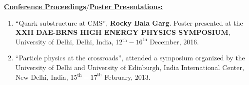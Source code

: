 \vspace{0.3cm}
\clearpage
{\large \underline{\textbf{Conference Proceedings$/$Poster Presentations:}}}
\begin{enumerate}
\item ``Quark substructure at CMS'', {\bf Rocky Bala Garg}. Poster presented at the {\bf XXII DAE-BRNS HIGH ENERGY
  PHYSICS SYMPOSIUM}, University of Delhi, Delhi, India, 12$^{\textrm{th}}-16^{\textrm{th}}$ December, 2016.
\item ``Particle physics at the crossroads'', attended a symposium organized by the University of Delhi and University of Edinburgh, India International
  Center, New Delhi, India, 15$^{\textrm{th}}-17^{\textrm{th}}$ February, 2013.
\end{enumerate}  


